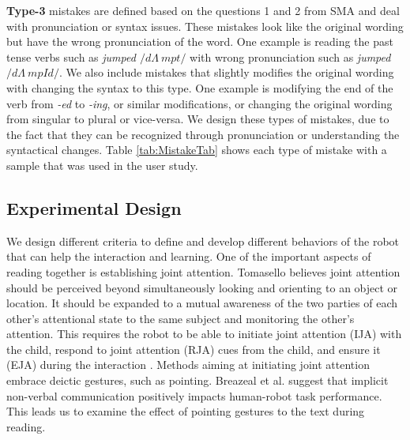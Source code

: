 \documentclass{sigchi}
\begin{document}
\textbf{Type-3} mistakes are defined based on the questions 1 and 2 from SMA and deal with pronunciation or syntax issues.
These mistakes look like the original wording but have the wrong pronunciation of the word. One example is reading the past tense verbs such as \textit{jumped $/d$\textyogh$\Lambda~mpt/$ }  with wrong pronunciation such as \textit{jumped  $/d$\textyogh$\Lambda~mpId/$}. 
We also include mistakes that slightly modifies the original wording with changing the syntax to this type. 
One example is modifying the end of the verb from \textit{-ed} to \textit{-ing}, or similar modifications, or changing the original wording from singular to plural or vice-versa.
We design these types of mistakes, due to the fact that they can be recognized through pronunciation or understanding the syntactical changes.
Table \ref{tab:MistakeTab} shows each type of mistake with a sample that was used in the user study. 







\subsection{Experimental Design}
We design different criteria to define and develop different behaviors of the robot that can help the interaction and learning.
One of the important aspects of reading together is establishing joint attention. 
Tomasello \cite{tomasello1995joint} believes joint attention should be perceived beyond simultaneously looking and orienting to an object or location.  
It should be expanded to a mutual awareness of the two parties of each other's attentional state to the same subject and monitoring the other's attention.
This requires the robot to be able to initiate joint attention (IJA) with the child, respond to joint attention (RJA) cues from the child, and ensure it (EJA) during the interaction \cite{mundy2007individual,huang2010joint, kaplan2006challenges}.
Methods aiming at initiating joint attention embrace deictic gestures, such as pointing. 
Breazeal et al. \cite{breazeal2005effects} suggest that implicit non-verbal communication positively impacts human-robot task performance.  
This leads us to examine the effect of pointing gestures to the text during reading. 
\end{document}
